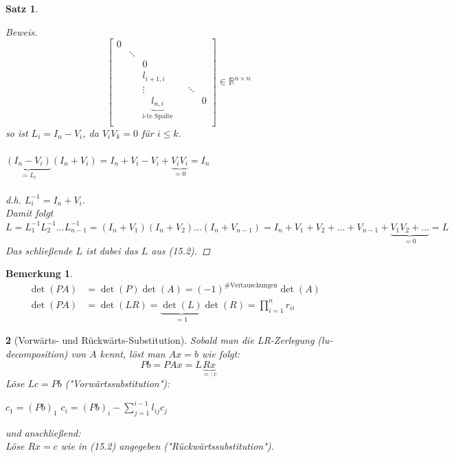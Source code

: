 \documentclass[12pt]{article}
\theoremstyle{break}
\newtheorem{theorem}{Satz}[subsection]
\newtheorem*{comment*}{Bemerkung}
\newtheorem{nothing}[theorem]{}
\begin{document}
\begin{theorem}
\begin{proof}[Beweis]
$$\begin{bmatrix}
0 \\
& \ddots \\
&& 0 \\
&& l_{i+1,i} &  \\
&& \vdots &&\ddots&\\
&& \underbrace{l_{n,i}}_{\text{i-te Spalte}} &&&0 \\
\end{bmatrix}
\in \mathbb{R}^{n\times n}$$
so ist $L_i = I_n - V_i$, da $V_iV_k = 0$ für $i \leq k$.\\\\
$\underbrace{(I_n - V_i)}_{=L_i} (I_n + V_i) = I_n + V_i - V_i + \underbrace{V_iV_i}_{=0} = I_n$\\\\
d.h. $L_i^{-1} = I_n + V_i$.\\
Damit folgt $L = L_1^{-1}L_2^{-1} ... L_{n-1}^{-1} = (I_n + V_1)(I_n + V_2) ... (I_n + V_{n-1}) = I_n + V_1 + V_2 +... + V_{n-1} + \underbrace{V_1V_2 + ...}_{=0} = L$\\
Das schließende $L$ ist dabei das $L$ aus (15.2).
\end{proof}
\end{theorem}

\begin{comment*}
\begin{align*}
\det(PA) &= \det(P)\det(A) = (-1)^{\text{\# Vertauschungen}} \det(A) &\\
\det(PA) &= \det(LR) = \underbrace{\det(L)}_{=1} \det(R) = \prod_{i=1}^n r_{ii}
\end{align*}
\end{comment*}

\begin{nothing}[Vorwärts- und Rückwärts-Substitution]
Sobald man die LR-Zerlegung (lu-decomposition) von $A$ kennt, löst man $Ax = b$ wie folgt:
$$Pb = PAx = L\underbrace{Rx}_{=: c}$$
Löse $Lc = Pb$ ("Vorwärtssubstitution"):
%
\begin{algorithmic}
\STATE $c_1 = (Pb)_1$
\STATE $c_i = (Pb)_i - \sum_{j=1}^{i-1} l_{ij}c_j$
\ENDFOR
\end{algorithmic}
%
und anschließend:\\
Löse $Rx = c$ wie in (15.2) angegeben ("Rückwärtssubstitution").
\end{nothing}
\end{document}
